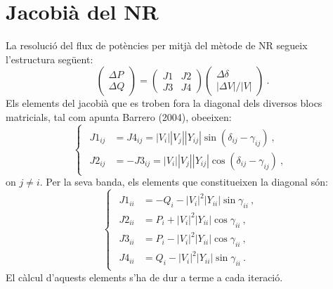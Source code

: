 \section{Jacobià del NR}
La resolució del flux de potències per mitjà del mètode de NR segueix l'estructura següent:
\begin{equation}
    \begin{pmatrix}
        \Delta P\\
        \Delta Q
    \end{pmatrix}
    = \begin{pmatrix}
        J1 & J2\\
        J3 & J4
    \end{pmatrix}
    \begin{pmatrix}
        \Delta \delta\\
        |\Delta V|/|V|
    \end{pmatrix}\ .
    \label{eq:annex4}
\end{equation}
Els elements del jacobià que es troben fora la diagonal dels diversos blocs matricials, tal com apunta Barrero (2004), obeeixen:
\begin{equation}
    \begin{cases}
    \begin{split}
        J1_{ij}&=J4_{ij}=|V_i||V_j||Y_{ij}|\sin(\delta_{ij}-\gamma_{ij})\ ,\\
        J2_{ij}&=-J3_{ij}=|V_i||V_j||Y_{ij}|\cos(\delta_{ij}-\gamma_{ij})\ ,
    \end{split}
\end{cases}
    \label{eq:annex5}
\end{equation}
on $j\neq i$. Per la seva banda, els elements que constitueixen la diagonal són:
\begin{equation}
    \begin{cases}
    \begin{split}
        J1_{ii}&=-Q_i-|V_i|^2|Y_{ii}|\sin\gamma_{ii}\ ,\\
        J2_{ii}&=P_i+|V_i|^2|Y_{ii}|\cos\gamma_{ii}\ ,\\
        J3_{ii}&=P_i-|V_i|^2|Y_{ii}|\cos\gamma_{ii}\ ,\\
        J4_{ii}&=Q_i-|V_i|^2|Y_{ii}|\sin\gamma_{ii}\ .
    \end{split}
\end{cases}
    \label{eq:annex6}
\end{equation}
El càlcul d'aquests elements s'ha de dur a terme a cada iteració. 

